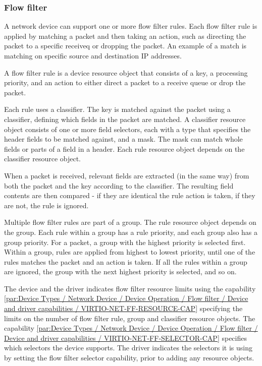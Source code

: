 \subsubsection{Flow filter}\label{sec:Device Types / Network Device / Device Operation / Flow filter}

A network device can support one or more flow filter rules. Each flow filter rule
is applied by matching a packet and then taking an action, such as directing the packet
to a specific receiveq or dropping the packet. An example of a match is
matching on specific source and destination IP addresses.

A flow filter rule is a device resource object that consists of a key,
a processing priority, and an action to either direct a packet to a
receive queue or drop the packet.

Each rule uses a classifier. The key is matched against the packet using
a classifier, defining which fields in the packet are matched.
A classifier resource object consists of one or more field selectors, each with
a type that specifies the header fields to be matched against, and a mask.
The mask can match whole fields or parts of a field in a header. Each
rule resource object depends on the classifier resource object.

When a packet is received, relevant fields are extracted
(in the same way) from both the packet and the key according to the
classifier. The resulting field contents are then compared -
if they are identical the rule action is taken, if they are not, the rule is ignored.

Multiple flow filter rules are part of a group. The rule resource object
depends on the group. Each rule within a
group has a rule priority, and each group also has a group priority. For a
packet, a group with the highest priority is selected first. Within a group,
rules are applied from highest to lowest priority, until one of the rules
matches the packet and an action is taken. If all the rules within a group
are ignored, the group with the next highest priority is selected, and so on.

The device and the driver indicates flow filter resource limits using the capability
\ref{par:Device Types / Network Device / Device Operation / Flow filter / Device and driver capabilities / VIRTIO-NET-FF-RESOURCE-CAP} specifying the limits on the number of flow filter rule,
group and classifier resource objects. The capability \ref{par:Device Types / Network Device / Device Operation / Flow filter / Device and driver capabilities / VIRTIO-NET-FF-SELECTOR-CAP} specifies which selectors the device supports.
The driver indicates the selectors it is using by setting the flow
filter selector capability, prior to adding any resource objects.

